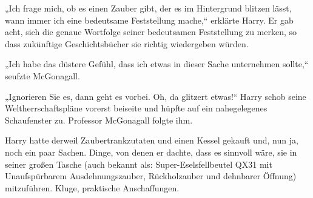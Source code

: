 „Ich frage mich, ob es einen Zauber gibt, der es im Hintergrund blitzen lässt, wann immer ich eine bedeutsame Feststellung mache,“ erklärte Harry. Er gab acht, sich die genaue Wortfolge seiner bedeutsamen Feststellung zu merken, so dass zukünftige Geschichtsbücher sie richtig wiedergeben würden.

„Ich habe das düstere Gefühl, dass ich etwas in dieser Sache unternehmen sollte,“ seufzte McGonagall.

„Ignorieren Sie es, dann geht es vorbei. Oh, da glitzert etwas!“ Harry schob seine Weltherrschaftspläne vorerst beiseite und hüpfte auf ein nahegelegenes Schaufenster zu. Professor McGonagall folgte ihm.

\later

Harry hatte derweil Zaubertrankzutaten und einen Kessel gekauft und, nun ja, noch ein paar Sachen. Dinge, von denen er dachte, dass es sinnvoll wäre, sie in seiner großen Tasche (auch bekannt als: Super-Eselsfellbeutel QX31 mit Unaufspürbarem Ausdehnungszauber, Rückholzauber und dehnbarer Öffnung) mitzuführen. Kluge, praktische Anschaffungen.


